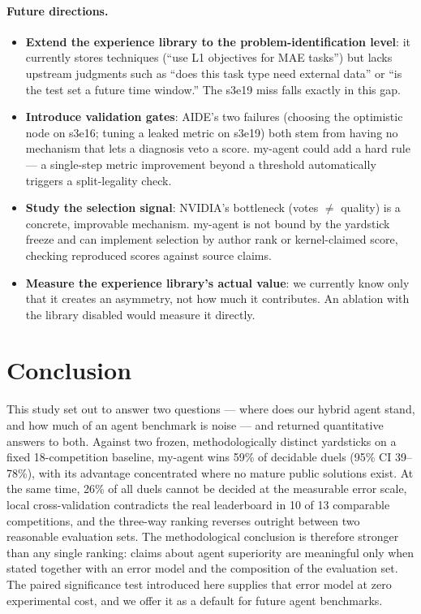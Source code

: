 \documentclass[11pt,a4paper]{article}
\begin{document}
\paragraph{Future directions.}
\begin{itemize}[leftmargin=*]
  \item \textbf{Extend the experience library to the problem-identification level}: it currently stores techniques (``use L1 objectives for MAE tasks'') but lacks upstream judgments such as ``does this task type need external data'' or ``is the test set a future time window.'' The s3e19 miss falls exactly in this gap.
  \item \textbf{Introduce validation gates}: AIDE's two failures (choosing the optimistic node on s3e16; tuning a leaked metric on s3e19) both stem from having no mechanism that lets a diagnosis veto a score. my-agent could add a hard rule --- a single-step metric improvement beyond a threshold automatically triggers a split-legality check.
  \item \textbf{Study the selection signal}: NVIDIA's bottleneck (votes $\neq$ quality) is a concrete, improvable mechanism. my-agent is not bound by the yardstick freeze and can implement selection by author rank or kernel-claimed score, checking reproduced scores against source claims.
  \item \textbf{Measure the experience library's actual value}: we currently know only that it creates an asymmetry, not how much it contributes. An ablation with the library disabled would measure it directly.
\end{itemize}

\section{Conclusion}

This study set out to answer two questions --- where does our hybrid agent stand, and how much of an agent benchmark is noise --- and returned quantitative answers to both. Against two frozen, methodologically distinct yardsticks on a fixed 18-competition baseline, my-agent wins 59\% of decidable duels (95\% CI 39--78\%), with its advantage concentrated where no mature public solutions exist. At the same time, 26\% of all duels cannot be decided at the measurable error scale, local cross-validation contradicts the real leaderboard in 10 of 13 comparable competitions, and the three-way ranking reverses outright between two reasonable evaluation sets. The methodological conclusion is therefore stronger than any single ranking: claims about agent superiority are meaningful only when stated together with an error model and the composition of the evaluation set. The paired significance test introduced here supplies that error model at zero experimental cost, and we offer it as a default for future agent benchmarks.
\end{document}
